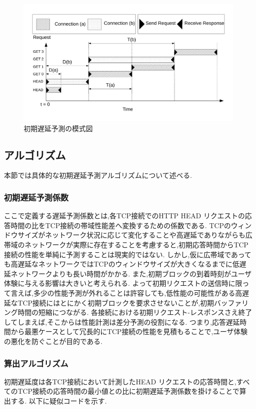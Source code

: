 \documentclass[a4j,12pt]{gradthesis_utf8}
\begin{document}
\begin{figure}[ht]
	\centering
	\includegraphics[width=14cm]{figure/head.pdf}
	\caption{初期遅延予測の模式図}
	\label{head}
\end{figure}

\newpage

\subsection{アルゴリズム}
\label{yosokuhouhou}
本節では具体的な初期遅延予測アルゴリズムについて述べる.

\subsubsection{初期遅延予測係数}
ここで定義する遅延予測係数とは,各TCP接続でのHTTP HEAD リクエストの応答時間の比をTCP接続の帯域性能差へ変換するための係数である.
TCPのウィンドウサイズがネットワーク状況に応じて変化することや高遅延でありながらも広帯域のネットワークが実際に存在することを考慮すると,初期応答時間からTCP接続の性能を単純に予測することは現実的ではない.
しかし,仮に広帯域であっても高遅延なネットワークではTCPのウィンドウサイズが大きくなるまでに低遅延ネットワークよりも長い時間がかかる.
また,初期ブロックの到着時刻がユーザ体験に与える影響は大きいと考えられる.
よって初期リクエストの送信時に限って言えば,多少の性能予測が外れることは許容しても,低性能の可能性がある高遅延なTCP接続にはとにかく初期ブロックを要求させないことが,初期バッファリング時間の短縮につながる.
各接続における初期リクエスト-レスポンスさえ終了してしまえば,そこからは性能計測は差分予測の役割になる.
つまり,応答遅延時間から最悪ケースとして冗長的にTCP接続の性能を見積もることで,ユーザ体験の悪化を防ぐことが目的である.

\subsubsection{算出アルゴリズム}
初期遅延度は各TCP接続において計測したHEAD リクエストの応答時間と,すべてのTCP接続の応答時間の最小値との比に初期遅延予測係数を掛けることで算出する.
以下に疑似コードを示す.
\end{document}
